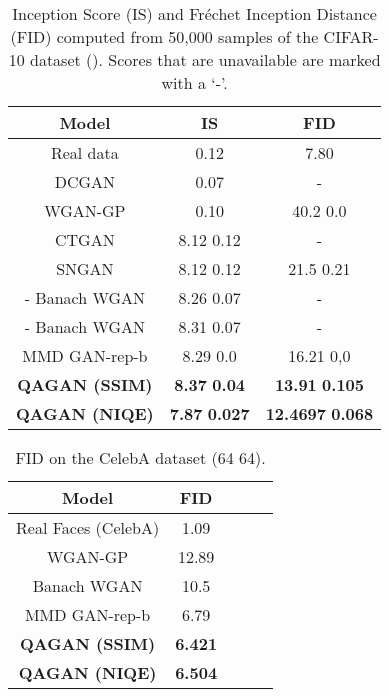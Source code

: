 \documentclass{article}
\begin{document}
\begin{table}[htbp]            
\centering
\caption{Inception Score (IS) and Fr\'echet Inception Distance (FID) computed from 50,000 samples of the CIFAR-10 dataset (). Scores that are unavailable are marked with a `-'.}
  \begin{tabular}{|c|c|c|}
    \hline
      {\bf{Model}} &
      {\bf{IS}} & {\bf{FID}}\\
      \hline
    Real data &   0.12 & 7.80 \\
      \hline
    DCGAN \cite{radford2015unsupervised} &   0.07 & -  \\
    \hline
     WGAN-GP \cite{gulrajani2017improved}  &   0.10  & 40.2  0.0 \\
     \hline
     CTGAN \cite{kim2018ct}  &  8.12  0.12 & -  \\
      \hline
     SNGAN \cite{miyato2018spectral}  &  8.12  0.12 & 21.5  0.21  \\
     \hline
     - Banach WGAN \cite{adler2018banach} & 8.26  0.07 & - \\
    \hline
      - Banach WGAN \cite{adler2018banach} & 8.31  0.07 & - \\
   \hline
     MMD GAN-rep-b \cite{li2017mmd} & 8.29  0.0 & 16.21  0,0\\
    \hline
     \textbf{QAGAN (SSIM)} & \textbf{8.37}  \textbf{0.04} & \textbf{13.91}  \textbf{0.105}\\
    \hline
    \textbf{QAGAN (NIQE)} & \textbf{7.87}  \textbf{0.027}   & \textbf{12.4697} \textbf{0.068}\\
\hline
    \end{tabular}
    \label{tab:cifar}
\end{table}
\begin{table}[htbp] 
\begin{center}
 \caption{FID on the CelebA dataset (64  64).}
 \label{tab:celeba}
\begin{tabular}{|c|c|c|c|c|}
    \hline
      {\bf{Model}} & {\bf{FID}} \\
      \hline
     Real Faces (CelebA) &  1.09 \\
    \hline
     WGAN-GP \cite{gulrajani2017improved}  & 12.89 \\
     \hline
      Banach WGAN \cite{adler2018banach} & 10.5 \\\hline
   MMD GAN-rep-b \cite{li2017mmd} & 6.79 \\\hline
     \textbf{QAGAN (SSIM)} &   \textbf{6.421} \\\hline
     \textbf{QAGAN (NIQE)} &   \textbf{6.504}\\\hline
     
  \end{tabular}
\end{center}
\end{table}
\end{document}
